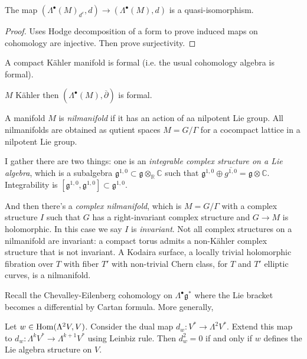 \begin{lemma}
\label{lemma-quasi-isomorphisms}
The map $(\Lambda^\bullet(M)_{d^c},d)\to
(\Lambda^\bullet(M),d)$
is a quasi-isomorphism.
\end{lemma}

\begin{proof}
Uses Hodge decomposition of a form to prove
induced maps
on cohomology are injective. Then prove
surjectivity.
\end{proof}

\begin{lemma}
\label{lemma-kahler-formal}
A compact Kähler manifold is formal (i.e. the
usual cohomology algebra
is formal).
\end{lemma}

\begin{theorem}
\label{theorem-kahler-dolbeault-formal}
$M$ Kähler then
$(\Lambda^\bullet(M),\overline{\partial})$ is
formal.
\end{theorem}

\medskip\noindent
A manifold $M$ is {\it nilmanifold} if it has
an action of aa nilpotent Lie
group. All nilmanifolds are obtained as
qutient spaces $M=G/\Gamma$
for a cocompact lattice in a nilpotent Lie
group.

I gather there are two things:
one is an {\it integrable complex structure
on a Lie algebra}, which
is a subalgebra
$\mathfrak{g}^{1,0}\subset \mathfrak{g}
\otimes_\mathbb{R} \mathbb{C}$
such that $\mathfrak{g}^{1,0} \oplus
\overline{g^{1,0}}
=\mathfrak{g} \otimes \mathbb{C}$.
Integrability is
$[\mathfrak{g}^{1,0},\mathfrak{g}^{1,0}]
\subset \mathfrak{g}^{1,0}$.

And then there's a {\it complex nilmanifold},
which is $M=G/\Gamma$
with a complex structure $I$ such that $G$
has
a right-invariant complex structure and $G
\to M$ is holomorphic.
In this case we say $I$ is {\it invariant}.
Not all complex structures on a nilmanifold
are invariant:
a compact torus admits a non-Kähler complex
structure that is not invariant.
A Kodaira surface, a locally trivial
holomorphic fibration over $T$ with fiber
$T'$ with non-trivial Chern class, for $T$
and $T'$ elliptic curves,
is a nilmanifold.

Recall the Chevalley-Eilenberg cohomology
on $\Lambda^\bullet\mathfrak{g}^*$ where the
Lie bracket becomes
a differential by Cartan formula.
More generally,

\begin{proposition}
\label{proposition-cheva-eilen-diffe}
Let $w \in \mathop{\mathrm{Hom}}\nolimits(\Lambda^2V,V)$.
Consider the dual map $d_w:V^* \to
\Lambda^2V^*$.
Extend this map to $d_w:\Lambda^kV^*  \to
\Lambda^{k+1}V^*$
using Leinbiz rule. Then $d^2_w=0$ if and
only if $w$
defines the Lie algebra structure on $V$.
\end{proposition}

